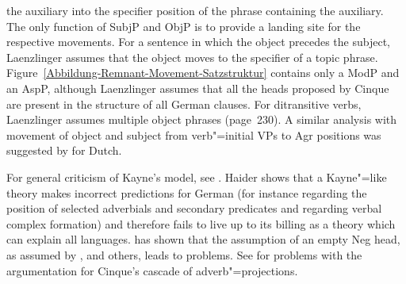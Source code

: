 the auxiliary into the specifier position of the phrase containing the auxiliary. The only function of SubjP and ObjP is to provide a landing site
for the respective movements. For a sentence in which the object precedes the subject, Laenzlinger assumes that the object moves to the specifier of a topic
phrase. Figure~\ref{Abbildung-Remnant-Movement-Satzstruktur} contains only a ModP and an AspP, although Laenzlinger assumes that all the heads proposed by Cinque are present
in the structure of all German clauses. For ditransitive verbs, Laenzlinger assumes multiple object
phrases (page~230). A similar analysis with movement of object and subject from verb"=initial VPs to
Agr positions was suggested by \citet{Zwart1994a-u} for Dutch.


For general criticism of Kayne's model, see . Haider shows that a Kayne"=like
theory makes incorrect predictions for German (for instance regarding the position of selected
adverbials and secondary predicates and regarding verbal complex formation) and therefore fails to live up to its billing as a theory which
can explain all languages. \citet[Section~4]{Haider97a} has shown that the assumption of an empty Neg head,
as assumed by \citet{Pollock89a-u}, \citet{Haegeman95a-u} and others, leads to problems. See
 for problems with the argumentation for Cinque's cascade of adverb"=projections.

